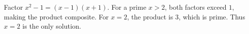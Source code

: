 Factor $x^2-1=(x-1)(x+1)$. For a prime $x>2$, both factors exceed $1$, making the product composite. For $x=2$, the product is $3$, which is prime. Thus $\boxed{x=2}$ is the only solution.
